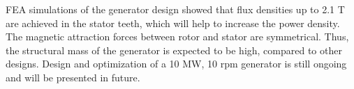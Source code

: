 \documentclass[12pt]{IET02}
\begin{document}
FEA simulations of the generator design showed that flux densities up to 2.1 T are achieved in the stator teeth, which will help to increase the power density. The magnetic attraction forces between rotor and stator are symmetrical. Thus, the structural mass of the generator is expected to be high, compared to other designs. Design and optimization of a 10 MW, 10 rpm generator is still ongoing and will be presented in future.













\end{document}
